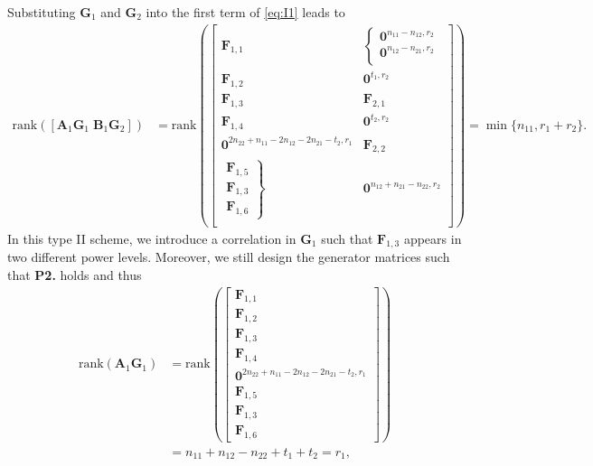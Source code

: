 \documentclass[12pt, draftclsnofoot, onecolumn]{IEEEtran}
\theoremstyle{definition}
\begin{document}
Substituting $\boldsymbol{G}_1$ and $\boldsymbol{G}_2$ into the first term of \eqref{eq:I1} leads to
\begin{align}\label{eq:case5ba1}
\text{rank}([\boldsymbol{A}_1\boldsymbol{G}_1 \; \boldsymbol{B}_1\boldsymbol{G}_2])&= %
\text{rank}\left(\begin{bmatrix}
\boldsymbol{F}_{1,1} & \left\{ {\begin{array}{*{20}{c}}
\boldsymbol{0}^{n_{11}-n_{12},r_2}\\
\boldsymbol{0}^{n_{12}-n_{21},r_2}\\
\end{array}} \right.\\
\boldsymbol{F}_{1,2} & \boldsymbol{0}^{t_1,r_2}\\
\boldsymbol{F}_{1,3}& \boldsymbol{F}_{2,1}\\
\boldsymbol{F}_{1,4} & \boldsymbol{0}^{t_2,r_2}\\
\boldsymbol{0}^{2n_{22}+n_{11}-2n_{12}-2n_{21}-t_2 ,r_1}& \boldsymbol{F}_{2,2}\\
\left. {\begin{array}{*{20}{c}}
\boldsymbol{F}_{1,5} \\
\boldsymbol{F}_{1,3} \\
\boldsymbol{F}_{1,6}
\end{array}} \right\} &\boldsymbol{0}^{n_{12}+n_{21}-n_{22},r_2}\\
\end{bmatrix}
\right)%
= \min\{n_{11},r_1+r_2\}.
\end{align}
In this type II scheme, we introduce a correlation in $\boldsymbol{G}_1$ such that $\boldsymbol{F}_{1,3}$ appears in two different power levels. Moreover, we still design the generator matrices such that \textbf{P2.} holds and thus
\begin{align}
\text{rank}(\boldsymbol{A}_1\boldsymbol{G}_1)&= \text{rank}\left(\begin{bmatrix}
\boldsymbol{F}_{1,1}\\
\boldsymbol{F}_{1,2} \\
\boldsymbol{F}_{1,3}\\
\boldsymbol{F}_{1,4}\\
\boldsymbol{0}^{2n_{22}+n_{11}-2n_{12}-2n_{21}-t_2 ,r_1}\\
\boldsymbol{F}_{1,5} \\
\boldsymbol{F}_{1,3} \\
\boldsymbol{F}_{1,6}
\end{bmatrix}\right)  \\
& = n_{11}+n_{12}-n_{22}+t_1+t_2 = r_1,\label{eq:a}
\end{align}
\end{document}
